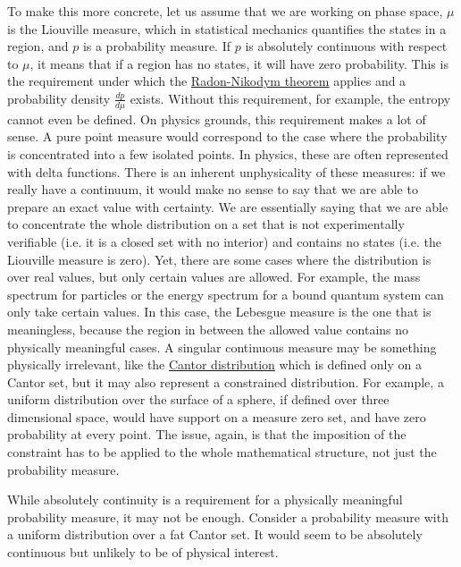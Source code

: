 To make this more concrete, let us assume that we are working on phase space, $\mu$ is the Liouville measure, which in statistical mechanics quantifies the states in a region, and $p$ is a probability measure. If $p$ is absolutely continuous with respect to $\mu$, it means that if a region has no states, it will have zero probability. This is the requirement under which the \href{https://en.wikipedia.org/wiki/Radon%E2%80%93Nikodym_theorem}{Radon-Nikodym theorem} applies and a probability density $\frac{dp}{d\mu}$ exists. Without this requirement, for example, the entropy cannot even be defined. On physics grounds, this requirement makes a lot of sense. A pure point measure would correspond to the case where the probability is concentrated into a few isolated points. In physics, these are often represented with delta functions. There is an inherent unphysicality of these measures: if we really have a continuum, it would make no sense to say that we are able to prepare an exact value with certainty. We are essentially saying that we are able to concentrate the whole distribution on a set that is not experimentally verifiable (i.e. it is a closed set with no interior) and contains no states (i.e. the Liouville measure is zero). Yet, there are some cases where the distribution is over real values, but only certain values are allowed. For example, the mass spectrum for particles or the energy spectrum for a bound quantum system can only take certain values. In this case, the Lebesgue measure is the one that is meaningless, because the region in between the allowed value contains no physically meaningful cases. A singular continuous measure may be something physically irrelevant, like the \href{https://en.wikipedia.org/wiki/Cantor_distribution}{Cantor distribution} which is defined only on a Cantor set, but it may also represent a constrained distribution. For example, a uniform distribution over the surface of a sphere, if defined over three dimensional space, would have support on a measure zero set, and have zero probability at every point. The issue, again, is that the imposition of the constraint has to be applied to the whole mathematical structure, not just the probability measure.

While absolutely continuity is a requirement for a physically meaningful probability measure, it may not be enough. Consider a probability measure with a uniform distribution over a fat Cantor set. It would seem to be absolutely continuous but unlikely to be of physical interest.

